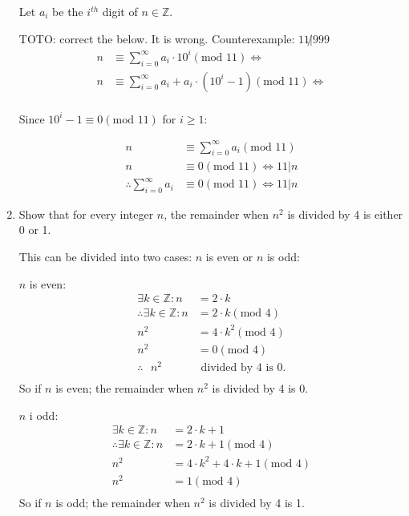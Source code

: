 \documentclass[10pt,\jkfside,a4paper]{article}
\begin{document}
\begin{enumerate}
\begin{center}
Let $a_i$ be the $i^{th}$ digit of $n \in \mathbb{Z}$.

TOTO: correct the below. It is wrong. Counterexample: $11\not|999$
\begin{equation}
\begin{split}
n &\equiv \sum^\infty_{i=0}a_i\cdot 10^i (\text{mod } 11) \Longleftrightarrow\\
n &\equiv \sum^\infty_{i=0}a_i + a_i\cdot(10^i - 1) (\text{mod } 11) \Longleftrightarrow\\
\end{split}
\end{equation}
\begin{center}
Since $10^i - 1\equiv 0 (\text{mod } 11)$ for $i \geq 1$:
\end{center}
\begin{equation}
\begin{split}
n &\equiv \sum^\infty_{i=0}a_i (\text{mod } 11)\\
n &\equiv 0 (\text{mod } 11) \Longleftrightarrow 11|n\\
\therefore \sum^\infty_{i=0}a_i& \equiv 0 (\text{mod } 11) \Longleftrightarrow 11|n
\end{split}
\end{equation}
\end{center}

\item Show that for every integer $n$, the remainder when $n^2$ is divided by 4 is either 0 or 1.

This can be divided into two cases: $n$ is even or $n$ is odd:

\begin{center}
$n$ is even:
\begin{equation}
\begin{split}
\exists k \in\mathbb{Z}: n &= 2\cdot k\\
\therefore \exists k \in \mathbb{Z}: n &= 2\cdot k(\text{mod } 4)\\
n^2 &= 4\cdot k^2(\text{mod } 4)\\
n^2 &= 0(\text{mod } 4)\\
\therefore\text{ $n^2$}&\text{ divided by 4 is 0.}\\
\end{split}
\end{equation}
So if $n$ is even; the remainder when $n^2$ is divided by 4 is 0.

$n$ i odd:
\begin{equation}
\begin{split}
\exists k \in\mathbb{Z}: n &= 2\cdot k + 1\\
\therefore \exists k \in \mathbb{Z}: n &= 2\cdot k + 1(\text{mod } 4)\\
n^2 &= 4\cdot k^2 + 4\cdot k + 1(\text{mod } 4)\\
n^2 &= 1(\text{mod } 4)\\
\end{split}
\end{equation}
So if $n$ is odd; the remainder when $n^2$ is divided by 4 is 1.


\end{center}
\end{enumerate}
\end{document}
